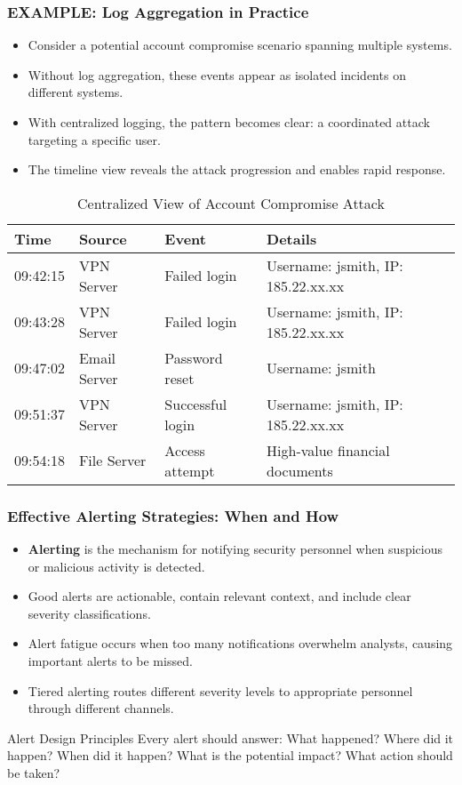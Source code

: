 \documentclass{beamer}
\begin{document}
\begin{frame}
\frametitle{EXAMPLE: Log Aggregation in Practice}
\begin{itemize}
\item Consider a potential account compromise scenario spanning multiple systems.
\item Without log aggregation, these events appear as isolated incidents on different systems.
\item With centralized logging, the pattern becomes clear: a coordinated attack targeting a specific user.
\item The timeline view reveals the attack progression and enables rapid response.
\end{itemize}

\begin{table}
\scriptsize
\begin{tabular}{llll}
\toprule
\textbf{Time} & \textbf{Source} & \textbf{Event} & \textbf{Details} \\
\midrule
09:42:15 & VPN Server & Failed login & Username: jsmith, IP: 185.22.xx.xx \\
09:43:28 & VPN Server & Failed login & Username: jsmith, IP: 185.22.xx.xx \\
09:47:02 & Email Server & Password reset & Username: jsmith \\
09:51:37 & VPN Server & Successful login & Username: jsmith, IP: 185.22.xx.xx \\
09:54:18 & File Server & Access attempt & High-value financial documents \\
\bottomrule
\end{tabular}
\caption{Centralized View of Account Compromise Attack}
\end{table}
\end{frame}

\begin{frame}
\frametitle{Effective Alerting Strategies: When and How}
\begin{itemize}
\item \textbf{Alerting} is the mechanism for notifying security personnel when suspicious or malicious activity is detected.
\item Good alerts are actionable, contain relevant context, and include clear severity classifications.
\item Alert fatigue occurs when too many notifications overwhelm analysts, causing important alerts to be missed.
\item Tiered alerting routes different severity levels to appropriate personnel through different channels.
\end{itemize}

\begin{alertblock}{Alert Design Principles}
\scriptsize
Every alert should answer: What happened? Where did it happen? When did it happen? What is the potential impact? What action should be taken?
\end{alertblock}
\end{frame}
\end{document}
